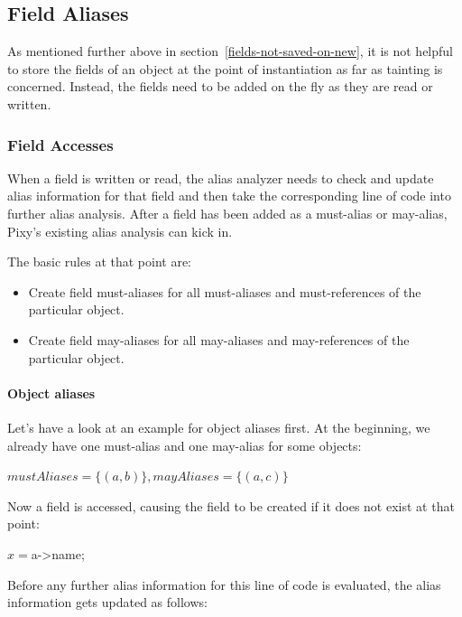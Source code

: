 \subsection{Field Aliases}

As mentioned further above in section~\ref{fields-not-saved-on-new}, it is not helpful to store the fields of an object at the point of instantiation as far as tainting is concerned. Instead, the fields need to be added on the fly as they are read or written.


\subsubsection{Field Accesses}

When a field is written or read, the alias analyzer needs to check and update alias information for that field and then take the corresponding line of code into further alias analysis. After a field has been added as a must-alias or may-alias, Pixy's existing alias analysis can kick in.

The basic rules at that point are:

\begin{itemize}
  \item Create field must-aliases for all must-aliases and must-references of the particular object.
  \item Create field may-aliases for all may-aliases and may-references of the particular object.
\end{itemize}


\paragraph{Object aliases}

Let's have a look at an example for object aliases first. At the beginning, we already have one must-alias and one may-alias for some objects:

$mustAliases = \{(a, b)\}, mayAliases = \{(a, c)\}$

Now a field is accessed, causing the field to be created if it does not exist at that point:

\begin{phpcode}
$x = $a->name;
\end{phpcode}

Before any further alias information for this line of code is evaluated, the alias information gets updated as follows:

